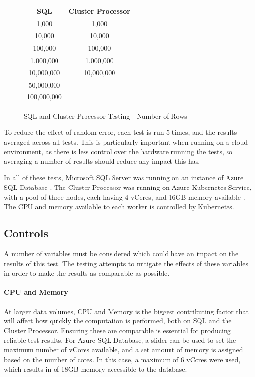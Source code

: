 \begin{figure}[ht]
	\centering
	\begin{tabular}{| c | c |}
		\hline
		\textbf{SQL} & \textbf{Cluster Processor} \\ \hline
		1,000 & 1,000 \\ \hline
		10,000 & 10,000 \\ \hline
		100,000 & 100,000 \\ \hline
		1,000,000 & 1,000,000 \\ \hline
		10,000,000 & 10,000,000 \\ \hline
		50,000,000 & \\ \hline
		100,000,000 & \\ \hline
	\end{tabular}
	\caption{SQL and Cluster Processor Testing - Number of Rows}
	\label{fig:sql-cluster-data-volumes}
\end{figure}

To reduce the effect of random error, each test is run 5 times, and the results averaged across all tests. This is particularly important when running on a cloud environment, as there is less control over the hardware running the tests, so averaging a number of results should reduce any impact this has.

In all of these tests, Microsoft SQL Server was running on an instance of Azure SQL Database \cite{azuresqldatabase}. The Cluster Processor was running on Azure Kubernetes Service, with a pool of three nodes, each having 4 vCores, and 16GB memory available \cite{azurekubernetesservice}. The CPU and memory available to each worker is controlled by Kubernetes.

\subsection{Controls}
A number of variables must be considered which could have an impact on the results of this test. The testing attempts to mitigate the effects of these variables in order to make the results as comparable as possible.

\paragraph{CPU and Memory}
At larger data volumes, CPU and Memory is the biggest contributing factor that will affect how quickly the computation is performed, both on SQL and the Cluster Processor. Ensuring these are comparable is essential for producing reliable test results. For Azure SQL Database, a slider can be used to set the maximum number of vCores available, and a set amount of memory is assigned based on the number of cores. In this case, a maximum of 6 vCores were used, which results in of 18GB memory accessible to the database.

